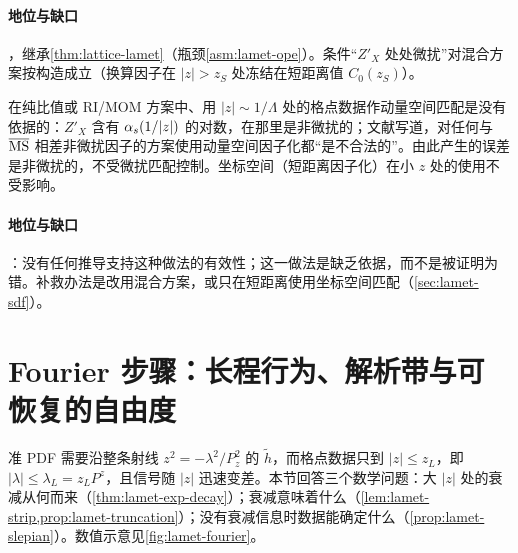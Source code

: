 \paragraph{地位与缺口}
\tagA，继承\cref{thm:lattice-lamet}（瓶颈\cref{asm:lamet-ope}）。条件“$Z'_X$ 处处微扰”对混合方案按构造成立（换算因子在 $|z|>z_S$ 处冻结在短距离值 $C_0(z_S)$）。

\begin{remark}\label{rem:lamet-ratio-large-z}
在纯比值或 RI/MOM 方案中、用 $|z|\sim1/\Lambda$ 处的格点数据作动量空间匹配是没有依据的：$Z'_X$ 含有 $\alpha_s(1/|z|)$ 的对数，在那里是非微扰的；文献\cite{JiEtAl2021}写道，对任何与 $\overline{\mathrm{MS}}$ 相差非微扰因子的方案使用动量空间因子化都“是不合法的”。由此产生的误差是非微扰的，不受微扰匹配控制。坐标空间（短距离因子化）在小 $z$ 处的使用不受影响。
\end{remark}

\paragraph{地位与缺口}
\tagC：没有任何推导支持这种做法的有效性；这一做法是缺乏依据，而不是被证明为错。补救办法是改用混合方案，或只在短距离使用坐标空间匹配（\cref{sec:lamet-sdf}）。

\section{Fourier 步骤：长程行为、解析带与可恢复的自由度}\label{sec:lamet-fourier}

准 PDF 需要沿整条射线 $z^2=-\lambda^2/P_z^2$ 的 $\tilde h$，而格点数据只到 $|z|\le z_L$，即 $|\lambda|\le\lambda_L=z_LP^z$，且信号随 $|z|$ 迅速变差。本节回答三个数学问题：大 $|z|$ 处的衰减从何而来（\cref{thm:lamet-exp-decay}）；衰减意味着什么（\cref{lem:lamet-strip,prop:lamet-truncation}）；没有衰减信息时数据能确定什么（\cref{prop:lamet-slepian}）。数值示意见\cref{fig:lamet-fourier}。


